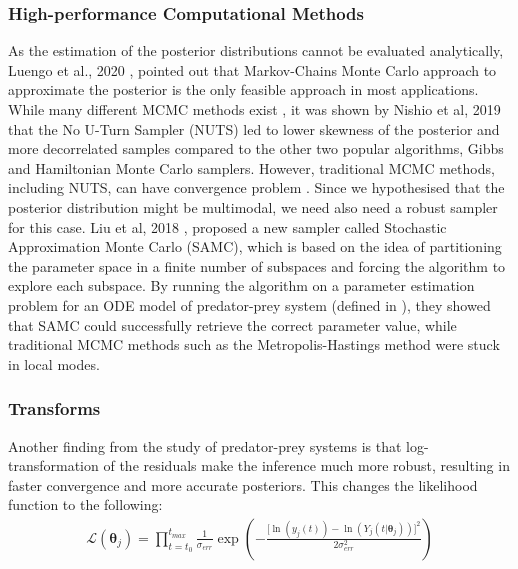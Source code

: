 \documentclass[11pt]{article}
\begin{document}
\subsubsection{High-performance Computational Methods}
As the estimation of the posterior distributions cannot be evaluated analytically, Luengo et al., 2020 \cite{MCMethods}, pointed out that Markov-Chains Monte Carlo approach to approximate the posterior is the only feasible approach in most applications. While many different MCMC methods exist \cite{ReviewMCMCAlgo}, it was shown by Nishio et al, 2019 \cite{NUTSvsHMCvsGibbs} that the No U-Turn Sampler (NUTS) led to lower skewness of the posterior and more decorrelated samples compared to the other two popular algorithms, Gibbs and Hamiltonian Monte Carlo samplers. However, traditional MCMC methods, including NUTS, can have convergence problem \cite{mcmcTrapped}. Since we hypothesised that the posterior distribution might be multimodal, we need also need a robust sampler for this case. Liu et al, 2018 \cite{liu_wang}, proposed a new sampler called Stochastic Approximation Monte Carlo (SAMC), which is based on the idea of partitioning the parameter space in a finite number of subspaces and forcing the algorithm to explore each subspace. By running the algorithm on a parameter estimation problem for an ODE model of predator-prey system (defined in \cite{fussmann}), they showed that SAMC could successfully retrieve the correct parameter value, while traditional MCMC methods such as the Metropolis-Hastings method were stuck in local modes.

\subsubsection{Transforms}
Another finding from the study of predator-prey systems \cite{rosenbaum} is that log-transformation of the residuals make the inference much more robust, resulting in faster convergence and more accurate posteriors. This changes the likelihood function to the following:
\begin{align*}
    \mathcal{L}(\boldsymbol{\theta}_j) = \prod_{t=t_0}^{t_{max}} \frac{1}{\sigma_{err}} \exp\left(-\frac{\lbrack\ln(y_{j}(t)) - \ln(Y_j(t|\boldsymbol{\theta}_j))\rbrack^2}{2\sigma_{err}^2}\right)  
\end{align*}

\end{document}
